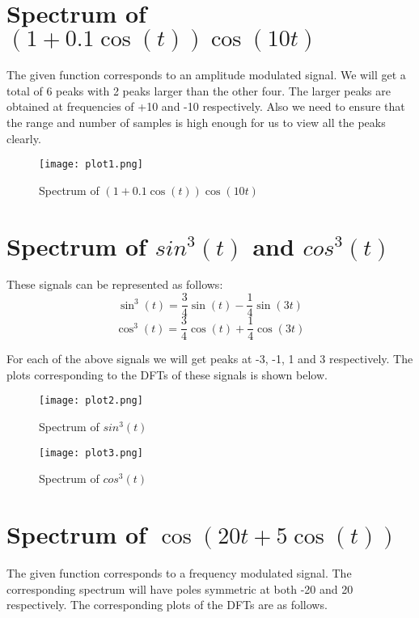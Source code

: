 \documentclass{article}
\begin{document}
\section{Spectrum of $(1+0.1\cos(t))\cos(10t)$}
The given function corresponds to an amplitude modulated signal. We will get a total of 6 peaks with 2 peaks larger than the other four. The larger peaks are obtained at frequencies of +10 and -10 respectively. Also we need to ensure that the range and number of samples is high enough for us to view all the peaks clearly. 
\begin{figure}[H]
\centering
\texttt{[image: plot1.png]}
\caption{Spectrum of $(1+0.1\cos(t))\cos(10t)$}
\label{fig:fig2}
\end{figure}



\section{Spectrum of $sin^3(t)$ and $cos^3(t)$}
These signals can be represented as follows:
\begin{equation}
\sin^3(t) = \frac{3}{4}\sin(t) - \frac{1}{4}\sin(3t)
\end{equation}
\begin{equation}
\cos^3(t) = \frac{3}{4}\cos(t) + \frac{1}{4}\cos(3t)
\end{equation}

For each of the above signals we will get peaks at -3, -1, 1 and 3 respectively. The plots corresponding to the DFTs of these signals is shown below.

\begin{figure}[H]
\centering
\texttt{[image: plot2.png]}
\caption{Spectrum of $sin^3(t)$}
\label{fig:fig3}
\end{figure}

\begin{figure}[H]
\centering
\texttt{[image: plot3.png]}
\caption{Spectrum of $cos^3(t)$}
\label{fig:fig4}
\end{figure}




\section{Spectrum of $\cos(20t + 5\cos(t))$}
The given function corresponds to a frequency modulated signal. The corresponding spectrum will have poles symmetric at both -20 and 20  respectively. The corresponding plots of the DFTs are as follows.
\end{document}
